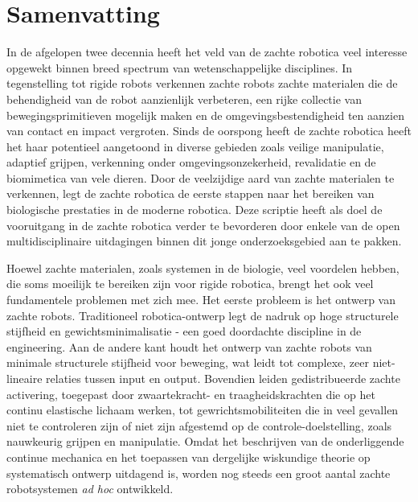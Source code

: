 \chapter*{Samenvatting}
\vspace{-10mm}
In de afgelopen twee decennia heeft het veld van de zachte robotica veel interesse opgewekt binnen breed spectrum van wetenschappelijke disciplines. In tegenstelling tot rigide robots verkennen zachte robots zachte materialen die de behendigheid van de robot aanzienlijk verbeteren, een rijke collectie van bewegingsprimitieven mogelijk maken en de omgevingsbestendigheid ten aanzien van contact en impact vergroten. Sinds de oorspong heeft de zachte robotica heeft het haar potentieel aangetoond in diverse gebieden zoals veilige manipulatie, adaptief grijpen, verkenning onder omgevingsonzekerheid, revalidatie en de biomimetica van vele dieren. Door de veelzijdige aard van zachte materialen te verkennen, legt de zachte robotica de eerste stappen naar het bereiken van biologische prestaties in de moderne robotica. Deze scriptie heeft als doel de vooruitgang in de zachte robotica verder te bevorderen door enkele van de open multidisciplinaire uitdagingen binnen dit jonge onderzoeksgebied aan te pakken.

Hoewel zachte materialen, zoals systemen in de biologie, veel voordelen hebben, die soms moeilijk te bereiken zijn voor rigide robotica, brengt het ook veel fundamentele problemen met zich mee. Het eerste probleem is het ontwerp van zachte robots. Traditioneel robotica-ontwerp legt de nadruk op hoge structurele stijfheid en gewichtsminimalisatie - een goed doordachte discipline in de engineering. Aan de andere kant houdt het ontwerp van zachte robots van minimale structurele stijfheid voor beweging, wat leidt tot complexe, zeer niet-lineaire relaties tussen input en output. Bovendien leiden gedistribueerde zachte activering, toegepast door zwaartekracht- en traagheidskrachten die op het continu elastische lichaam werken, tot gewrichtsmobiliteiten die in veel gevallen niet te controleren zijn of niet zijn afgestemd op de controle-doelstelling, zoals nauwkeurig grijpen en manipulatie. Omdat het beschrijven van de onderliggende continue mechanica en het toepassen van dergelijke wiskundige theorie op systematisch ontwerp uitdagend is, worden nog steeds een groot aantal zachte robotsystemen \textit{ad hoc} ontwikkeld.

